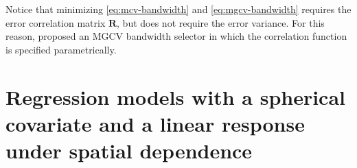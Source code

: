 \documentclass[12pt]{report} %
\newcommand{\bH}{\mathbf{H}}
\newcommand{\bX}{\mathbf{X}}
\begin{document}
Notice that minimizing \eqref{eq:mcv-bandwidth} and \eqref{eq:mgcv-bandwidth} requires the error correlation matrix $\mathbf{R}$, but does not require the error variance. For this reason, \citet{Francisco-Fernandez2005} proposed an MGCV bandwidth selector in which the correlation function is specified parametrically. 

\chapter{Regression models with a spherical covariate and a linear response under spatial dependence} \label{ch:reg-lin-sph-spat} 
\end{document}

